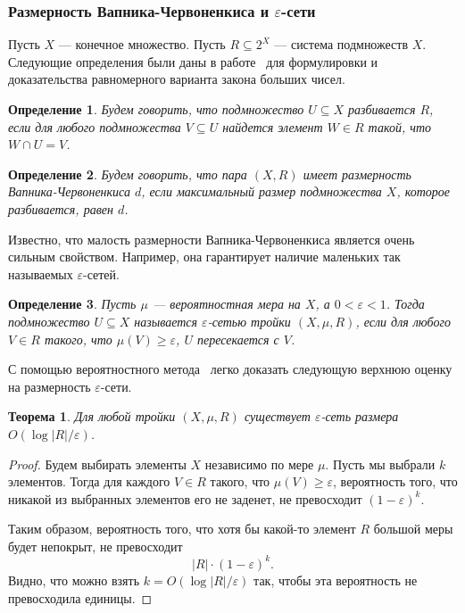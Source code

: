 \documentclass[12pt]{article}
\newcommand{\eps}{\varepsilon}
\newtheorem{definition}{Определение}
\newtheorem{theorem}{Теорема}
\begin{document}
    \subsubsection{Размерность Вапника-Червоненкиса и $\eps$-сети}
    \label{subsubsection_vapnik_chervonenkis}

    Пусть $X$ --- конечное множество. Пусть $R \subseteq 2^X$ --- система подмножеств $X$.
    Следующие определения были даны в работе~\cite{VC71} для формулировки и доказательства равномерного варианта
    закона больших чисел.

    \begin{definition}
        Будем говорить, что подмножество $U \subseteq X$ \emph{разбивается} $R$, если
        для любого подмножества $V \subseteq U$ найдется элемент $W \in R$ такой,
        что $W \cap U = V$.
    \end{definition}
    \begin{definition}
        Будем говорить, что пара $(X, R)$ имеет размерность Вапника-Червоненкиса $d$, если максимальный размер 
        подмножества $X$, которое разбивается, равен $d$.
    \end{definition}

    Известно, что малость размерности Вапника-Червоненкиса является очень сильным свойством. Например, она гарантирует
    наличие маленьких так называемых $\varepsilon$-сетей.

    \begin{definition}
        Пусть $\mu$ --- вероятностная мера на $X$, а $0 < \varepsilon < 1$.
        Тогда подмножество $U \subseteq X$
        называется \emph{$\varepsilon$-сетью} тройки $(X, \mu, R)$, если для любого
        $V \in R$ такого, что $\mu(V) \geq \varepsilon$, $U$ пересекается с $V$.
    \end{definition}

    С помощью вероятностного метода~\cite{AS92} легко доказать следующую верхнюю оценку на размерность
    $\varepsilon$-сети.

    \begin{theorem}
        \label{naive_epsilon_net}
        Для любой тройки $(X, \mu, R)$ существует $\varepsilon$-сеть размера
        $O(\log |R| / \varepsilon)$.
    \end{theorem}
    \begin{proof}
        Будем выбирать элементы $X$ независимо по мере $\mu$.
        Пусть мы выбрали $k$ элементов. Тогда для каждого $V \in R$ такого, что
        $\mu(V) \geq \varepsilon$, вероятность того, что никакой из выбранных элементов
        его не заденет, не превосходит $(1 - \varepsilon)^k$.

        Таким образом, вероятность того, что хотя бы какой-то элемент $R$ большой меры будет
        непокрыт, не превосходит
        $$
            |R| \cdot (1 - \varepsilon)^k.
        $$
        Видно, что можно взять $k = O(\log |R| / \varepsilon)$ так, чтобы эта вероятность не превосходила
        единицы.
    \end{proof}
\end{document}
